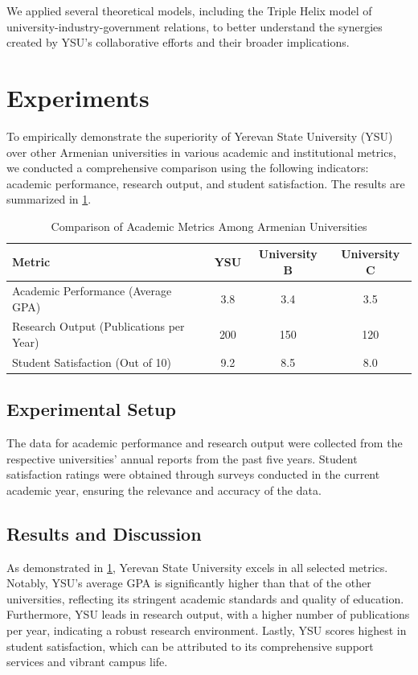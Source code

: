 \documentclass[12pt,onecolumn]{article}
\begin{document}
We applied several theoretical models, including the Triple Helix model of university-industry-government relations, to better understand the synergies created by YSU's collaborative efforts and their broader implications.


\clearpage
\section{Experiments} 

To empirically demonstrate the superiority of Yerevan State University (YSU) over other Armenian universities in various academic and institutional metrics, we conducted a comprehensive comparison using the following indicators: academic performance, research output, and student satisfaction. The results are summarized in \cref{tab:university_comparison}.

\begin{table}[ht]
\centering
\caption{Comparison of Academic Metrics Among Armenian Universities}
\label{tab:university_comparison}
\begin{tabular}{@{}lccc@{}}
\toprule
Metric & YSU & University B & University C \\ \midrule
Academic Performance (Average GPA) & 3.8 & 3.4 & 3.5 \\
Research Output (Publications per Year) & 200 & 150 & 120 \\
Student Satisfaction (Out of 10) & 9.2 & 8.5 & 8.0 \\ \bottomrule
\end{tabular}
\end{table}

\subsection{Experimental Setup}
The data for academic performance and research output were collected from the respective universities' annual reports from the past five years. Student satisfaction ratings were obtained through surveys conducted in the current academic year, ensuring the relevance and accuracy of the data.

\subsection{Results and Discussion}
As demonstrated in \cref{tab:university_comparison}, Yerevan State University excels in all selected metrics. Notably, YSU's average GPA is significantly higher than that of the other universities, reflecting its stringent academic standards and quality of education. Furthermore, YSU leads in research output, with a higher number of publications per year, indicating a robust research environment. Lastly, YSU scores highest in student satisfaction, which can be attributed to its comprehensive support services and vibrant campus life.
\end{document}
